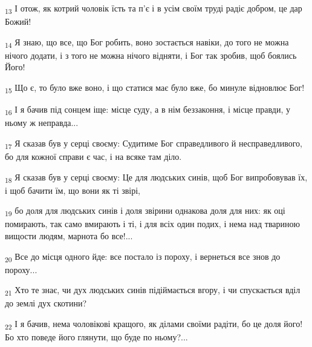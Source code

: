 \begin{tcolorbox}
\textsubscript{13} І отож, як котрий чоловік їсть та п'є і в усім своїм труді радіє добром, це дар Божий!
\end{tcolorbox}
\begin{tcolorbox}
\textsubscript{14} Я знаю, що все, що Бог робить, воно зостається навіки, до того не можна нічого додати, і з того не можна нічого відняти, і Бог так зробив, щоб боялись Його!
\end{tcolorbox}
\begin{tcolorbox}
\textsubscript{15} Що є, то було вже воно, і що статися має було вже, бо минуле відновлює Бог!
\end{tcolorbox}
\begin{tcolorbox}
\textsubscript{16} І я бачив під сонцем іще: місце суду, а в нім беззаконня, і місце правди, у ньому ж неправда...
\end{tcolorbox}
\begin{tcolorbox}
\textsubscript{17} Я сказав був у серці своєму: Судитиме Бог справедливого й несправедливого, бо для кожної справи є час, і на всяке там діло.
\end{tcolorbox}
\begin{tcolorbox}
\textsubscript{18} Я сказав був у серці своєму: Це для людських синів, щоб Бог випробовував їх, і щоб бачити їм, що вони як ті звірі,
\end{tcolorbox}
\begin{tcolorbox}
\textsubscript{19} бо доля для людських синів і доля звірини однакова доля для них: як оці помирають, так само вмирають і ті, і для всіх один подих, і нема над твариною вищости людям, марнота бо все!...
\end{tcolorbox}
\begin{tcolorbox}
\textsubscript{20} Все до місця одного йде: все постало із пороху, і вернеться все знов до пороху...
\end{tcolorbox}
\begin{tcolorbox}
\textsubscript{21} Хто те знає, чи дух людських синів підіймається вгору, і чи спускається вділ до землі дух скотини?
\end{tcolorbox}
\begin{tcolorbox}
\textsubscript{22} І я бачив, нема чоловікові кращого, як ділами своїми радіти, бо це доля його! Бо хто поведе його глянути, що буде по ньому?...
\end{tcolorbox}
